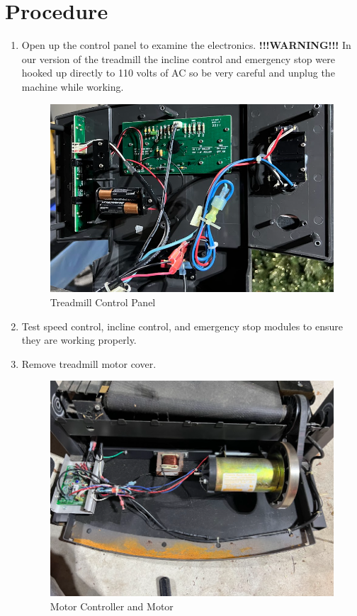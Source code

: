 \documentclass[journal]{IEEEtran}
\begin{document}
\section{Procedure}
\begin{enumerate}
\item Open up the control panel to examine the electronics. {\bfseries !!!WARNING!!!} In our version of the treadmill the incline control and emergency stop were hooked up directly to 110 volts of AC so be very careful and unplug the machine while working.
    \begin{figure}[H]
            \centering
            \includegraphics[width=0.5\linewidth]{Treadmill_Control_Panel.png}
            \caption{Treadmill Control Panel}
            \label{fig:1}
    \end{figure}
\item Test speed control, incline control, and emergency stop modules to ensure they are working properly.
\item Remove treadmill motor cover.
    \begin{figure}[H]
            \centering
            \includegraphics[width=0.5\linewidth]{Eagle_Eye_View_4.png}
            \caption{Motor Controller and Motor}
            \label{fig:2}
    \end{figure}
    
\vfill\eject


\end{enumerate}
\end{document}
